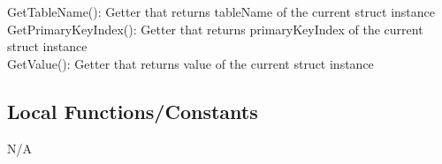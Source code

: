 \documentclass[12pt]{article}
\begin{document}
\noindent GetTableName(): Getter that returns tableName of the current struct instance \\

\noindent GetPrimaryKeyIndex(): Getter that returns primaryKeyIndex of the current struct instance \\ 

\noindent GetValue(): Getter that returns value of the current struct instance \\

\subsection{Local Functions/Constants}
N/A
\medskip


\newpage
\end{document}
